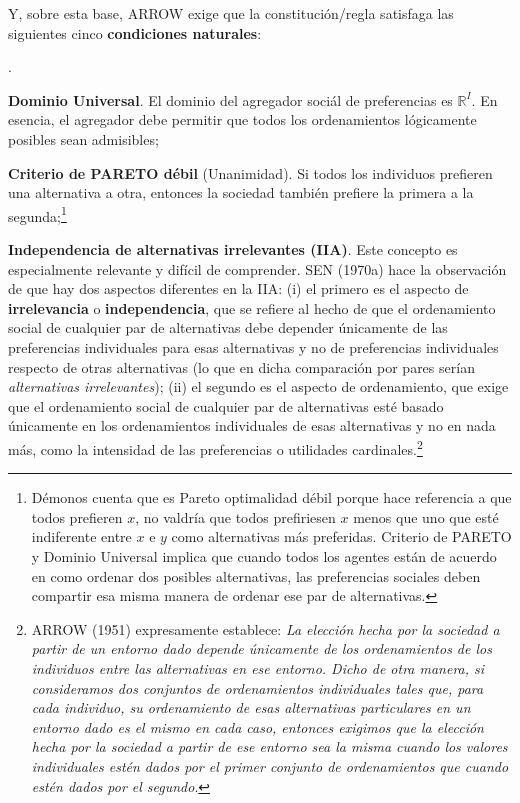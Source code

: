 \documentclass[10pt,a4paper]{article}
\newcounter{numitem}
\newenvironment{lnum}
      {\begin{list}{\arabic{numitem}.}{%
          \usecounter{numitem}%
          \setlength{\leftmargin}{1cm}%
          \setlength{\parskip}{3pt}%
          \setlength{\itemsep}{0pt}%
          \setlength{\parsep}{0pt}%
      }}
      {\end{list}}
\begin{document}
Y, sobre esta base, ARROW exige que la constitución/regla satisfaga las siguientes cinco \textbf{condiciones naturales}:
\begin{lnum}
    \item \textbf{Dominio Universal}. El dominio del agregador sociál de preferencias es $\mathbb R^I$. En esencia, el agregador debe permitir que todos los ordenamientos lógicamente posibles sean admisibles;
    \item \textbf{Criterio de PARETO débil} (Unanimidad). Si todos los individuos prefieren una alternativa a otra, entonces la sociedad también prefiere la primera a la segunda;\footnote{%
        Démonos cuenta que es Pareto optimalidad débil porque hace referencia a que todos prefieren $x$, no valdría que todos prefiriesen $x$ menos que uno que esté indiferente entre $x$ e $y$ como alternativas más preferidas. Criterio de PARETO y Dominio Universal implica que cuando todos los agentes están de acuerdo en como ordenar dos posibles alternativas, las preferencias sociales deben compartir esa misma manera de ordenar ese par de alternativas.
    }
    \item \textbf{Independencia de alternativas irrelevantes (IIA)}. Este concepto es especialmente relevante y difícil de comprender. SEN (1970a) hace la observación de que hay dos aspectos diferentes en la IIA: (i) el primero es el aspecto de \textbf{irrelevancia} o \textbf{independencia}, que se refiere al hecho de que el ordenamiento social de cualquier par de alternativas debe depender únicamente de las preferencias individuales para esas alternativas y no de preferencias individuales respecto de otras alternativas (lo que en dicha comparación por pares serían \textit{alternativas irrelevantes}); (ii) el segundo es el aspecto de ordenamiento, que exige que el ordenamiento social de cualquier par de alternativas esté basado únicamente en los ordenamientos individuales de esas alternativas y no en nada más, como la intensidad de las preferencias o utilidades cardinales.\footnote{
    ARROW (1951) expresamente establece: \textit{La elección hecha por la sociedad a partir de un entorno dado depende únicamente de los ordenamientos de los individuos entre las alternativas en ese entorno. Dicho de otra manera, si consideramos dos conjuntos de ordenamientos individuales tales que, para cada individuo, su ordenamiento de esas alternativas particulares en un entorno dado es el mismo en cada caso, entonces exigimos que la elección hecha por la sociedad a partir de ese entorno sea la misma cuando los valores individuales estén dados por el primer conjunto de ordenamientos que cuando estén dados por el segundo}. 

}
\end{lnum}
\end{document}
